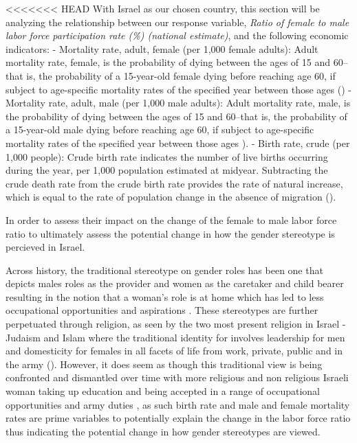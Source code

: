 \documentclass[11pt,a4paper,]{article}
\begin{document}
<<<<<<< HEAD
With Israel as our chosen country, this section will be analyzing the
relationship between our response variable, \emph{Ratio of female to
male labor force participation rate (\%) (national estimate)}, and the
following economic indicators: - Mortality rate, adult, female (per
1,000 female adults): Adult mortality rate, female, is the probability
of dying between the ages of 15 and 60--that is, the probability of a
15-year-old female dying before reaching age 60, if subject to
age-specific mortality rates of the specified year between those ages
(\textcite{TheWorldBank2018}) - Mortality rate, adult, male (per 1,000
male adults): Adult mortality rate, male, is the probability of dying
between the ages of 15 and 60--that is, the probability of a 15-year-old
male dying before reaching age 60, if subject to age-specific mortality
rates of the specified year between those ages
\textcite{TheWorldBank2018}). - Birth rate, crude (per 1,000 people):
Crude birth rate indicates the number of live births occurring during
the year, per 1,000 population estimated at midyear. Subtracting the
crude death rate from the crude birth rate provides the rate of natural
increase, which is equal to the rate of population change in the absence
of migration (\textcite{TheWorldBank2018}).

In order to assess their impact on the change of the female to male
labor force ratio to ultimately assess the potential change in how the
gender stereotype is percieved in Israel.

Across history, the traditional stereotype on gender roles has been one
that depicts males roles as the provider and women as the caretaker and
child bearer resulting in the notion that a woman's role is at home
which has led to less occupational opportunities and aspirations
\textcite{DickeAL2019}. These stereotypes are further perpetuated
through religion, as seen by the two most present religion in Israel -
Judaism and Islam where the traditional identity for involves leadership
for men and domesticity for females \textcite{Woodhead} in all facets of
life from work, private, public and in the army
(\textcite{GittlemenSI2020}). However, it does seem as though this
traditional view is being confronted and dismantled over time with more
religious and non religious Israeli woman taking up education and being
accepted in a range of occupational opportunities and army duties
\textcite{Levy2006}, as such birth rate and male and female mortality
rates are prime variables to potentially explain the change in the labor
force ratio thus indicating the potential change in how gender
stereotypes are viewed.
\end{document}
